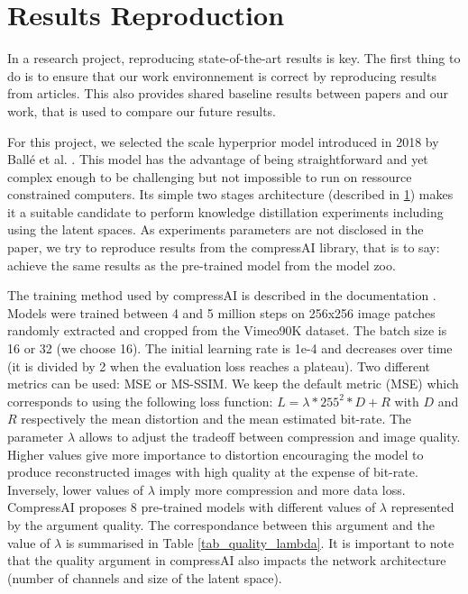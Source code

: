 \section{Results Reproduction}
In a research project, reproducing state-of-the-art results is key. The first thing to do is to ensure that our work environnement is correct by reproducing results from articles. This also provides shared baseline results between papers and our work, that is used to compare our future results.

For this project, we selected the scale hyperprior model introduced in 2018 by Ballé et al. \cite{ballé2018variationalimagecompressionscale}. This model has the advantage of being straightforward and yet complex enough to be challenging but not impossible to run on ressource constrained computers. Its simple two stages architecture (described in \ref{}) makes it a suitable candidate to perform knowledge distillation experiments including using the latent spaces. As experiments parameters are not disclosed in the paper, we try to reproduce results from the compressAI library, that is to say: achieve the same results as the pre-trained model from the model zoo.

The training method used by compressAI is described in the documentation \cite{compressai_train}. Models were trained between 4 and 5 million steps on 256x256 image patches randomly extracted and cropped from the Vimeo90K dataset. The batch size is 16 or 32 (we choose 16). The initial learning rate is 1e-4 and decreases over time (it is divided by 2 when the evaluation loss reaches a plateau). Two different metrics can be used: MSE or MS-SSIM. We keep the default metric (MSE) which corresponds to using the following loss function: \(L = \lambda * 255^{2} * D + R\) with \(D\) and \(R\) respectively the mean distortion and the mean estimated bit-rate. The parameter \(\lambda\) allows to adjust the tradeoff between compression and image quality. Higher values give more importance to distortion encouraging the model to produce reconstructed images with high quality at the expense of bit-rate. Inversely, lower values of \(\lambda\) imply more compression and more data loss. CompressAI proposes 8 pre-trained models with different values of \(\lambda\) represented by the argument \textsf{quality}. The correspondance between this argument and the value of \(\lambda\) is summarised in Table \ref{tab_quality_lambda}. It is important to note that the \textsf{quality} argument in compressAI also impacts the network architecture (number of channels and size of the latent space).

